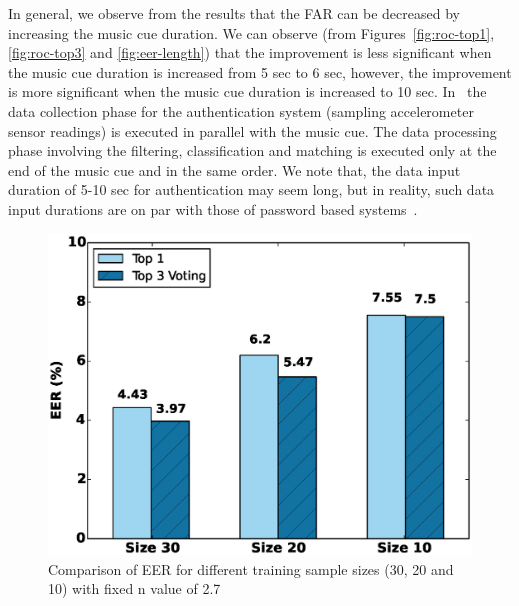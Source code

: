 In general, we observe from the results that the FAR can 
be decreased by increasing the music cue duration. 
We can observe (from Figures~\ref{fig:roc-top1}, \ref{fig:roc-top3} and 
\ref{fig:eer-length}) that the improvement is less significant when the music 
cue duration is increased from 5 sec to 6 sec, however, the improvement is 
more 
significant when the music cue duration is increased to 10 sec. 
In \systemname~the data collection phase for the authentication system 
(sampling accelerometer sensor readings) is executed in parallel with the 
music cue. The data processing phase involving the filtering, classification 
and matching is executed only at the end of the music cue and in the same 
order.
We note that, the data input duration of 5-10 sec for authentication 
may seem long, but in reality, such data input durations are on par with those 
of password based systems~\cite{von2013patterns}.

\begin{figure}[t]
\centering
\includegraphics [width=\columnwidth]{figure/exp2_vary_size.eps}
\caption{Comparison of EER for different training sample sizes (30, 20 and 10) 
with fixed n value of 2.7}
\label{fig:eer-size}
\end{figure}


